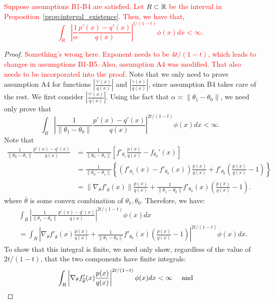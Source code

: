 \documentclass{article}
\begin{document}
\begin{proposition}
\label{prop:theta_A4_bound}
\textcolor{red}{Suppose assumptions B1-B4 are satisfied. Let $R \subset {\mathbb R}$ be the interval in Proposition~\ref{prop:interval_existence}. Then, we have that,
\[
\int_R \left| \frac{1}{\alpha} \frac{p'(x) - q'(x)}{q(x)} \right|^{t/(1-t)} \phi(x) dx < \infty.
\]
}
\end{proposition}
\begin{proof}
\textcolor{red}{Something's wrong here. Exponent needs to be $4t/(1-t)$, which leads to changes in assumptions B1-B5. Also, assumption A4 was modified. That also needs to be incorporated into the proof.}
Note that we only need to prove assumption A4 for functions $\left| \frac{\gamma'(x)} {q(x)}\right|$ and $\left| \frac{\gamma(x)}{q(x)} \right|$, since assumption B4 takes care of the rest. We first consider $\left| \frac{\gamma'(x)} {q(x)}\right|$. Using the fact that $\alpha \asymp \| \theta_1 - \theta_0 \|$, we need only prove that
\[
\int_R \left| \frac{1}{\| \theta_1 - \theta_0\| } \frac{p'(x) - q'(x)}{q(x)} \right|^{2t/(1-t)} \phi(x) dx < \infty.
\]
Note that
\begin{align*}
\frac{1}{\| \theta_0 - \theta_1 \|} \frac{p'(x) - q'(x)}{q(x)}& = 
   \frac{1}{\| \theta_0 - \theta_1 \|} \left[
           f'_{\theta_1} \frac{p(x)}{q(x)} - f_{\theta_0}'(x) \right] \\
  &= \frac{1}{\|\theta_0 - \theta_1\|} \left\{ 
          ( f'_{\theta_1}(x) - f'_{\theta_0}(x) ) \frac{p(x)}{q(x)} 
       + f'_{\theta_0} \left( \frac{p(x)}{q(x)} - 1 \right) \right\} \\
  &= \| \nabla_{\theta} f'_{\bar{\theta}}(x) \| \frac{p(x)}{q(x)} 
         + \frac{1}{\| \theta_1 - \theta_0\|} f'_{\theta_0}(x) \left( \frac{p(x)}{q(x)} - 1 \right).
\end{align*}
where $\bar{\theta}$ is some convex combination of $\theta_1, \theta_0$. Therefore, we have:
\begin{align*}
& \int_R \left| \frac{1}{\| \theta_1 - \theta_0\| } \frac{p'(x) - q'(x)}{q(x)} \right|^{2t/(1-t)} \phi(x) dx \\
& =  \int_R \left|  \nabla_{\theta} f'_{\bar{\theta}}(x) \frac{p(x)}{q(x)} 
         + \frac{1}{\| \theta_1 - \theta_0\|} f'_{\theta_0}(x) \left( \frac{p(x)}{q(x)} - 1 \right)  \right|^{2t/(1-t)} \phi(x)dx.
\end{align*}
To show that this integral is finite, we need only show, regardless of the value of $2t/(1-t)$, that the two components have finite integrals:
\[
 \int_R \left|  \nabla_{\theta} f'_{\overline{\theta}}(x) \frac{p(x)}{q(x)} \right|^{2t/(1-t)} \phi(x) dx < \infty \quad \textrm{ and } \quad
\]
\end{proof}
\end{document}
